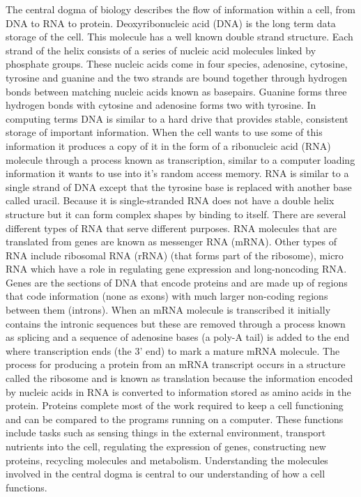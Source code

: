 \documentclass[11pt,a4paper,titlepage,twoside,openright]{style/unimelbthesis}
\theoremstyle{definition}
\theoremstyle{definition}
\theoremstyle{definition}
\theoremstyle{remark}
\begin{document}
\begin{mainmatter}
The central dogma of biology describes the flow of information within a cell, from DNA to RNA to protein. Deoxyribonucleic acid (DNA) is the long term data storage of the cell. This molecule has a well known double strand structure. Each strand of the helix consists of a series of nucleic acid molecules linked by phosphate groups. These nucleic acids come in four species, adenosine, cytosine, tyrosine and guanine and the two strands are bound together through hydrogen bonds between matching nucleic acids known as basepairs. Guanine forms three hydrogen bonds with cytosine and adenosine forms two with tyrosine. In computing terms DNA is similar to a hard drive that provides stable, consistent storage of important information. When the cell wants to use some of this information it produces a copy of it in the form of a ribonucleic acid (RNA) molecule through a process known as transcription, similar to a computer loading information it wants to use into it's random access memory. RNA is similar to a single strand of DNA except that the tyrosine base is replaced with another base called uracil. Because it is single-stranded RNA does not have a double helix structure but it can form complex shapes by binding to itself. There are several different types of RNA that serve different purposes. RNA molecules that are translated from genes are known as messenger RNA (mRNA). Other types of RNA include ribosomal RNA (rRNA) (that forms part of the ribosome), micro RNA which have a role in regulating gene expression and long-noncoding RNA. Genes are the sections of DNA that encode proteins and are made up of regions that code information (none as exons) with much larger non-coding regions between them (introns). When an mRNA molecule is transcribed it initially contains the intronic sequences but these are removed through a process known as splicing and a sequence of adenosine bases (a poly-A tail) is added to the end where transcription ends (the 3' end) to mark a mature mRNA molecule. The process for producing a protein from an mRNA transcript occurs in a structure called the ribosome and is known as translation because the information encoded by nucleic acids in RNA is converted to information stored as amino acids in the protein. Proteins complete most of the work required to keep a cell functioning and can be compared to the programs running on a computer. These functions include tasks such as sensing things in the external environment, transport nutrients into the cell, regulating the expression of genes, constructing new proteins, recycling molecules and metabolism. Understanding the molecules involved in the central dogma is central to our understanding of how a cell functions.


\end{mainmatter}
\end{document}
